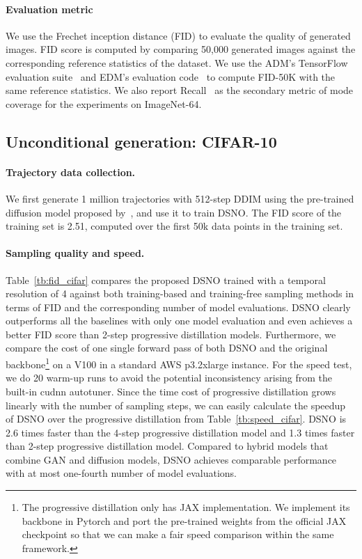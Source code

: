 \paragraph{Evaluation metric}
We use the Frechet inception distance (FID) \cite{heusel2017gans} to evaluate the quality of generated images. FID score is computed by comparing 50,000 generated images against the corresponding reference statistics of the dataset.  We use the ADM’s TensorFlow evaluation suite~\citep{dhariwal2021diffusion} and EDM's evaluation code~\cite{karras2022elucidating} to compute FID-50K with the same reference statistics. We also report Recall~\cite{kynkaanniemi2019improved} as the secondary metric of mode coverage for the experiments on ImageNet-64. 


\subsection{Unconditional generation: CIFAR-10}

\paragraph{Trajectory data collection.} We first generate 1 million trajectories with 512-step DDIM \cite{song2020denoising} using the pre-trained diffusion model proposed by~\citet{salimans2021progressive}, and use it to train DSNO. The FID score of the training set is 2.51, computed over the first 50k data points in the training set. 

\vspace{-0.1in}
\paragraph{Sampling quality and speed.}
Table~\ref{tb:fid_cifar} compares the proposed DSNO trained with a temporal resolution of 4 against both training-based and training-free sampling methods in terms of FID and the corresponding number of model evaluations. DSNO clearly outperforms all the baselines with only one model evaluation and even achieves a better FID score than 2-step progressive distillation models. Furthermore, we compare the cost of one single forward pass of both DSNO and the original backbone\footnote{The progressive distillation only has JAX implementation. We implement its backbone in Pytorch and port the pre-trained weights from the official JAX checkpoint so that we can make a fair speed comparison within the same framework. } on a V100 in a standard AWS p3.2xlarge instance. For the speed test, we do 20 warm-up runs to avoid the potential inconsistency arising from the built-in cudnn autotuner. Since the time cost of progressive distillation grows linearly with the number of sampling steps, we can easily calculate the speedup of DSNO over the progressive distillation from Table~\ref{tb:speed_cifar}. DSNO is 2.6 times faster than the 4-step progressive distillation model and 1.3 times faster than 2-step progressive distillation model. Compared to hybrid models that combine GAN and diffusion models, DSNO achieves comparable performance with at most one-fourth number of model evaluations. 

